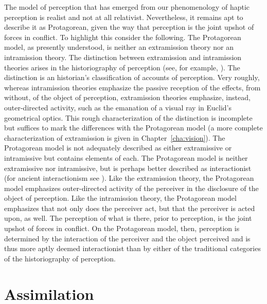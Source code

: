 The model of perception that has emerged from our phenomenology of haptic perception is realist and not at all relativist. Nevertheless, it remains apt to describe it as Protagorean, given the way that perception is the joint upshot of forces in conflict. To highlight this consider the following. The Protagorean model, as presently understood, is neither an extramission theory nor an intramission theory. The distinction between extramission and intramission theories arises in the historiography of perception (see, for example, \citealt[3--67]{Lindberg:1977aa}). The distinction is an historian's classification of accounts of perception. Very roughly, whereas intramission theories emphasize the passive reception of the effects, from without, of the object of perception, extramission theories emphasize, instead, outer-directed activity, such as the emanation of a visual ray in Euclid's geometrical optics. This rough characterization of the distinction is incomplete but suffices to mark the differences with the Protagorean model (a more complete characterization of extramission is given in Chapter~\ref{cha:vision}). The Protagorean model is not adequately described as either extramissive or intramissive but contains elements of each. The Protagorean model is neither extramissive nor intramissive, but is perhaps better described as interactionist (for ancient interactionism see \citealt{Squire:2016aa}). Like the extramission theory, the Protagorean model emphasizes outer-directed activity of the perceiver in the disclosure of the object of perception. Like the intramission theory, the Protagorean model emphasizes that not only does the perceiver act, but that the perceiver is acted upon, as well. The perception of what is there, prior to perception, is the joint upshot of forces in conflict. On the Protagorean model, then, perception is determined by the interaction of the perceiver and the object perceived and is thus more aptly deemed interactionist than by either of the traditional categories of the historiography of perception. 


\section{Assimilation} %
\label{sec:assimilation}

